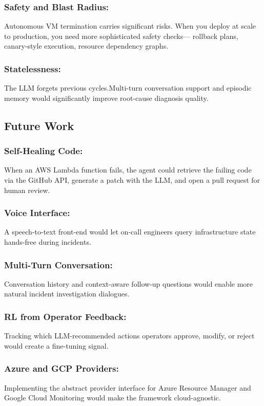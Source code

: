 \documentclass{ieeeaccess}
\begin{document}
\subsubsection{Safety and Blast Radius:}Autonomous VM termination carries significant risks. When you deploy at scale to production, you need more sophisticated safety checks— rollback plans, canary-style execution, resource dependency graphs.

\subsubsection{Statelessness:}The LLM forgets previous cycles.Multi-turn conversation support and episodic memory would significantly improve root-cause
diagnosis quality.

\subsection{Future Work}

\subsubsection{Self-Healing Code:} When an AWS Lambda function fails, the agent could
retrieve the failing code via the GitHub API, generate a patch with the LLM,
and open a pull request for human review.

\subsubsection{Voice Interface:} A speech-to-text front-end would let on-call
engineers query infrastructure state hands-free during incidents.

\subsubsection{Multi-Turn Conversation:} Conversation history and context-aware
follow-up questions would enable more natural incident investigation dialogues.

\subsubsection{RL from Operator Feedback:} Tracking which LLM-recommended actions
operators approve, modify, or reject would create a fine-tuning signal.

\subsubsection{Azure and GCP Providers:} Implementing the abstract provider interface
for Azure Resource Manager and Google Cloud Monitoring would make the framework
cloud-agnostic.
\end{document}
